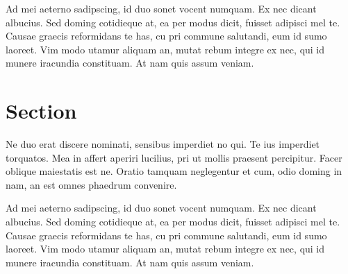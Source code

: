 \documentclass[10pt,a4paper,twocolumn,german]{article}
\begin{document}
	Ad mei aeterno sadipscing, id duo sonet vocent numquam.
	Ex nec dicant albucius. Sed doming cotidieque at, ea per modus dicit, fuisset adipisci mel te.
	Causae graecis reformidans te has, cu pri commune salutandi, eum id sumo laoreet.
	Vim modo utamur aliquam an, mutat rebum integre ex nec, qui id munere iracundia constituam.
	At nam quis assum veniam.	

\section{Section}

	Ne duo erat discere nominati, sensibus imperdiet no qui.
	Te ius imperdiet torquatos.
	Mea in affert aperiri lucilius, pri ut mollis praesent percipitur.
	Facer oblique maiestatis est ne.
	Oratio tamquam neglegentur et cum, odio doming in nam, an est omnes phaedrum convenire.

	Ad mei aeterno sadipscing, id duo sonet vocent numquam.
	Ex nec dicant albucius. Sed doming cotidieque at, ea per modus dicit, fuisset adipisci mel te.
	Causae graecis reformidans te has, cu pri commune salutandi, eum id sumo laoreet.
	Vim modo utamur aliquam an, mutat rebum integre ex nec, qui id munere iracundia constituam.
	At nam quis assum veniam.	
\end{document}

